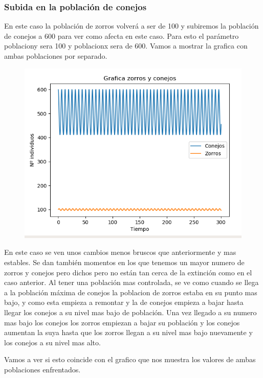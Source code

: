 \documentclass[]{article}
\begin{document}
\subsubsection{Subida en la población de conejos}
En este caso la población de zorros volverá a ser de 100 y subiremos la población de conejos a 600 para ver como afecta en este caso. Para esto el parámetro poblaciony sera 100 y poblacionx sera de 600.
Vamos a mostrar la grafica con ambas poblaciones por separado.
\begin{figure}[H]
	\centering
	\includegraphics[width=1\linewidth]{screenshot005}
	\caption{}
	\label{fig:screenshot005}
\end{figure}
En este caso se ven unos cambios menos bruscos que anteriormente y mas estables. Se dan también momentos en los que tenemos un mayor numero de zorros y conejos pero dichos pero no están tan cerca de la extinción como en el caso anterior. Al tener una población mas controlada, se ve como cuando se llega a la población máxima de conejos la poblacion de zorros estaba en su punto mas bajo, y como esta empieza a remontar y la de conejos empieza a bajar hasta llegar los conejos a su nivel mas bajo de población. Una vez llegado a su numero mas bajo los conejos los zorros empiezan a bajar su población y los conejos aumentan la suya hasta que los zorros llegan a su nivel mas bajo nuevamente y los conejos a su nivel mas alto. 
\newpage

Vamos a ver si esto coincide con el grafico que nos muestra los valores de ambas poblaciones enfrentados.
\end{document}
